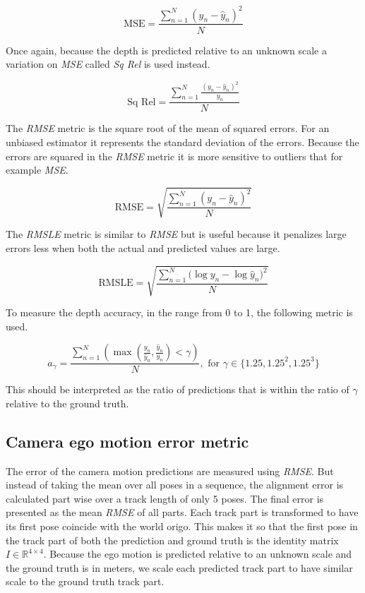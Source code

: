 \[
\textrm{MSE}=\frac{\sum^N_{n=1}{(y_n-\hat{y}_n)^2}}{N}
\]

Once again, because the depth is predicted relative to an unknown scale a variation on \textit{MSE} called \textit{Sq Rel} is used instead.

\[
\textrm{Sq Rel}=\frac{\sum^N_{n=1}{\frac{(y_n-\hat{y}_n)^2}{y_n}}}{N}
\]

The \textit{RMSE} metric is the square root of the mean of squared errors. For an unbiased estimator it represents the standard deviation of the errors. Because the errors are squared in the \textit{RMSE} metric it is more sensitive to outliers that for example \textit{MSE}.

\[
\textrm{RMSE}=\sqrt{\frac{\sum^N_{n=1}{(y_n-\hat{y}_n)^2}}{N}}
\]

The \textit{RMSLE} metric is similar to \textit{RMSE} but is useful because it penalizes large errors less when both the actual and predicted values are large.

\[
\textrm{RMSLE}=\sqrt{\frac{\sum^N_{n=1}{(\log{y_n}-\log{\hat{y}_n)}^2}}{N}}
\]

To measure the depth accuracy, in the range from 0 to 1, the following metric is used.

\[
a_{\gamma} = \frac{\sum^N_{n=1}{(\max(\frac{y_n}{\hat{y}_n}, \frac{\hat{y}_n}{y_n}) < \gamma)}}{N},\textrm{ for }\gamma \in \{1.25, 1.25^2, 1.25^3\}
\]

This should be interpreted as the ratio of predictions that is within the ratio of $ \gamma $ relative to the ground truth.

\subsection{Camera ego motion error metric}
\label{sec:egometric}

The error of the camera motion predictions are measured using \textit{RMSE}. But instead of taking the mean over all poses in a sequence, the alignment error is calculated part wise over a track length of only 5 poses. The final error is presented as the mean \textit{RMSE} of all parts. Each track part is transformed to have its first pose coincide with the world origo. This makes it so that the first pose in the track part of both the prediction and ground truth is the identity matrix $I \in \mathbb{R}^{4\times 4}$. Because the ego motion is predicted relative to an unknown scale and the ground truth is in meters, we scale each predicted track part to have similar scale to the ground truth track part.


